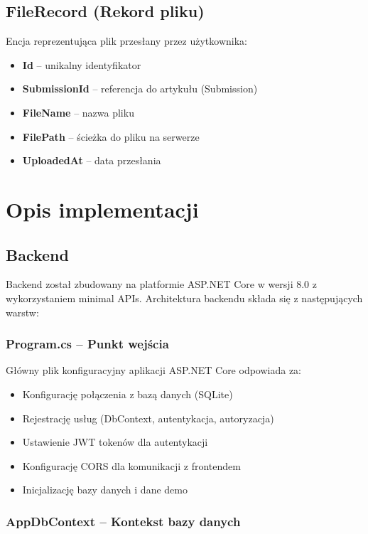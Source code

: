 \documentclass[times]{san}
\begin{document}
\subsection{FileRecord (Rekord pliku)}

Encja reprezentująca plik przesłany przez użytkownika:

\begin{itemize}
    \item \textbf{Id} -- unikalny identyfikator
    \item \textbf{SubmissionId} -- referencja do artykułu (Submission)
    \item \textbf{FileName} -- nazwa pliku
    \item \textbf{FilePath} -- ścieżka do pliku na serwerze
    \item \textbf{UploadedAt} -- data przesłania
\end{itemize}

\section{Opis implementacji}

\subsection{Backend}

Backend został zbudowany na platformie ASP.NET Core w wersji 8.0 z wykorzystaniem minimal APIs. Architektura backendu składa się z następujących warstw:

\subsubsection{Program.cs -- Punkt wejścia}

Główny plik konfiguracyjny aplikacji ASP.NET Core odpowiada za:

\begin{itemize}
    \item Konfigurację połączenia z bazą danych (SQLite)
    \item Rejestrację usług (DbContext, autentykacja, autoryzacja)
    \item Ustawienie JWT tokenów dla autentykacji
    \item Konfigurację CORS dla komunikacji z frontendem
    \item Inicjalizację bazy danych i dane demo
\end{itemize}

\subsubsection{AppDbContext -- Kontekst bazy danych}
\end{document}

